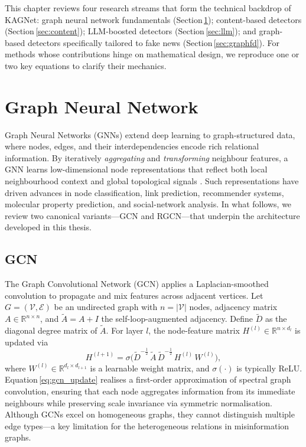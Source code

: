 
This chapter reviews four research streams that form the technical backdrop of KAGNet:  
graph neural network fundamentals (Section\,\ref{sec:gcn});  
content-based detectors (Section\,\ref{sec:content});  
LLM-boosted detectors (Section\,\ref{sec:llm});  
and graph-based detectors specifically tailored to fake news (Section\,\ref{sec:graphfd}).  
For methods whose contributions hinge on mathematical design, we reproduce one or two key equations to clarify their mechanics.

\section{Graph Neural Network}\label{sec:gcn}
Graph Neural Networks (GNNs) extend deep learning to graph-structured data, where
nodes, edges, and their interdependencies encode rich relational information.
By iteratively \textit{aggregating} and \textit{transforming} neighbour features, a GNN learns
low-dimensional node representations that reflect both local neighbourhood context and
global topological signals \cite{kipf2017semisupervised}.
Such representations have driven advances in node classification, link prediction,
recommender systems, molecular property prediction, and social-network analysis.
In what follows, we review two canonical variants—GCN and RGCN—that underpin the
architecture developed in this thesis.

\subsection{GCN}\label{sec:gcn:gcn}
The Graph Convolutional Network (GCN)\cite{kipf2017semisupervised} applies a Laplacian-smoothed
convolution to propagate and mix features across adjacent vertices.
Let $G=(\mathcal V,\mathcal E)$ be an undirected graph with $n=|\mathcal V|$
nodes, adjacency matrix $A\in\mathbb R^{n\times n}$,
and $\tilde A=A+I$ the self-loop-augmented adjacency.
Define $\tilde D$ as the diagonal degree matrix of $\tilde A$.
For layer $l$, the node-feature matrix $H^{(l)}\in\mathbb R^{n\times d_l}$
is updated via
\begin{equation}
H^{(l+1)}
   = \sigma\!\bigl(
       \tilde D^{-\frac12}\,
       \tilde A\,
       \tilde D^{-\frac12}\,
       H^{(l)}\,
       W^{(l)}
     \bigr),
\label{eq:gcn_update}
\end{equation}
where $W^{(l)}\in\mathbb R^{d_l\times d_{l+1}}$ is a learnable weight matrix,
and $\sigma(\cdot)$ is typically ReLU.
Equation\,\eqref{eq:gcn_update} realises a first-order approximation of
spectral graph convolution, ensuring that each node aggregates information
from its immediate neighbours while preserving scale invariance via symmetric
normalisation.
Although GCNs excel on homogeneous graphs,
they cannot distinguish multiple edge types—a key limitation for the
heterogeneous relations in misinformation graphs.

